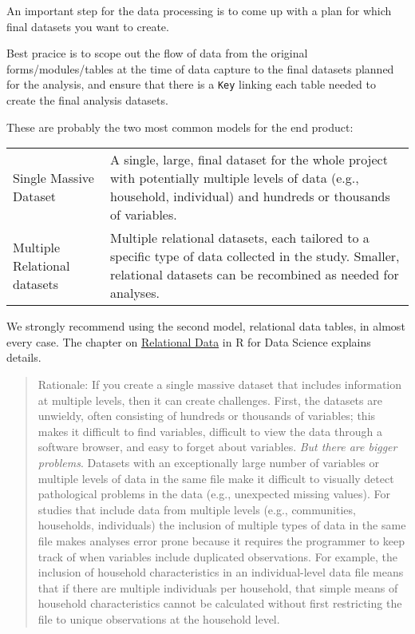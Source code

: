\documentclass[
]{book}
\begin{document}
An important step for the data processing is to come up with a plan for which final datasets you want to create.

Best pracice is to scope out the flow of data from the original forms/modules/tables at the time of data capture to the final datasets planned for the analysis, and ensure that there is a \texttt{Key} linking each table needed to create the final analysis datasets.

These are probably the two most common models for the end product:

\begin{longtable}[]{@{}ll@{}}
\toprule
\endhead
\begin{minipage}[t]{0.18\columnwidth}\raggedright
Single Massive Dataset\strut
\end{minipage} & \begin{minipage}[t]{0.76\columnwidth}\raggedright
A single, large, final dataset for the whole project with potentially multiple levels of data (e.g., household, individual) and hundreds or thousands of variables.\strut
\end{minipage}\tabularnewline
\begin{minipage}[t]{0.18\columnwidth}\raggedright
Multiple Relational datasets\strut
\end{minipage} & \begin{minipage}[t]{0.76\columnwidth}\raggedright
Multiple relational datasets, each tailored to a specific type of data collected in the study. Smaller, relational datasets can be recombined as needed for analyses.\strut
\end{minipage}\tabularnewline
\bottomrule
\end{longtable}

We strongly recommend using the second model, relational data tables, in almost every case. The chapter on \href{https://r4ds.had.co.nz/relational-data.html}{Relational Data} in R for Data Science explains details.

\begin{quote}
Rationale: If you create a single massive dataset that includes information at multiple levels, then it can create challenges. First, the datasets are unwieldy, often consisting of hundreds or thousands of variables; this makes it difficult to find variables, difficult to view the data through a software browser, and easy to forget about variables. \emph{But there are bigger problems}. Datasets with an exceptionally large number of variables or multiple levels of data in the same file make it difficult to visually detect pathological problems in the data (e.g., unexpected missing values). For studies that include data from multiple levels (e.g., communities, households, individuals) the inclusion of multiple types of data in the same file makes analyses error prone because it requires the programmer to keep track of when variables include duplicated observations. For example, the inclusion of household characteristics in an individual-level data file means that if there are multiple individuals per household, that simple means of household characteristics cannot be calculated without first restricting the file to unique observations at the household level.
\end{quote}
\end{document}
